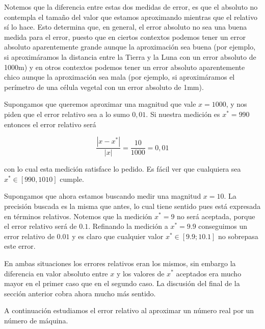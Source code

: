 Notemos que la diferencia entre estas dos medidas de error, es que el absoluto no contempla el tamaño del valor que estamos aproximando mientras que el relativo sí lo hace. Esto determina que, en general, el error absoluto no sea una buena medida para el error, puesto que en ciertos contextos podemos tener un error absoluto aparentemente grande aunque la aproximación sea buena (por ejemplo, si aproximáramos la distancia entre la Tierra y la Luna con un error absoluto de 1000m) y en otros contextos podemos tener un error absoluto aparentemente chico aunque la aproximación sea mala (por ejemplo, si aproximáramos el perímetro de una célula vegetal con un error absoluto de 1mm).

Supongamos que queremos aproximar una magnitud que vale $x = 1000$, y nos piden que el error relativo sea a lo sumo $0,01$. Si nuestra medición es $x^* = 990$ entonces el error relativo será

\[\frac{|x - x^*|}{|x|} = \frac{10}{1000} = 0,01\]

con lo cual esta medición satisface lo pedido. Es fácil ver que cualquiera sea $x^* \in [990, 1010]$ cumple.

Supongamos que ahora estamos buscando medir una magnitud $x = 10$. La precisión buscada es la misma que antes, lo cual tiene sentido pues está expresada en términos relativos. Notemos que la medición $x^* = 9$ no será aceptada, porque el error relativo será de $0.1$. Refinando la medición a $x^* = 9.9$ conseguimos un error relativo de $0.01$ y es claro que cualquier valor $x^* \in [9.9; 10.1]$ no sobrepasa este error.

En ambas situaciones los errores relativos eran los mismos, sin embargo la diferencia en valor absoluto entre $x$ y los valores de $x^*$ aceptados era mucho mayor en el primer caso que en el segundo caso. La discusión del final de la sección anterior cobra ahora mucho más sentido.

A continuación estudiamos el error relativo al aproximar un número real por un número de máquina.

